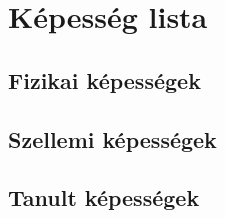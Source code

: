 






\pagestyle{empty}

%
\clearpage

\setmainfont[Ligatures=TeX,Scale=1.4]{EB Garamond}

\tableofcontents

\pagestyle{fancy}
\renewcommand{\chaptermark}[1]{\markboth{#1}{}}
\setmainfont[Ligatures=TeX,Scale=1.4]{EB Garamond}


\clearpage

\clearpage

\clearpage


\clearpage

\clearpage

\clearpage

\chapter{Képesség lista}
\section{Fizikai képességek}

\clearpage

\clearpage

\clearpage

\clearpage

\clearpage
\section{Szellemi képességek}

\clearpage
\section{Tanult képességek}
\clearpage


\clearpage

\clearpage

\clearpage


\clearpage

\clearpage

\clearpage

\clearpage

\clearpage

